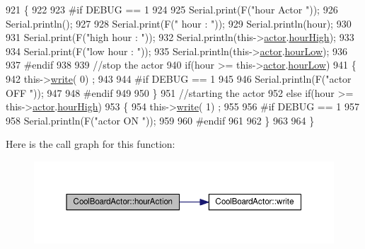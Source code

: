 \begin{DoxyCode}
921 \{
922 
923 \textcolor{preprocessor}{#if DEBUG == 1}
924     
925     Serial.print(F(\textcolor{stringliteral}{"hour Actor "}));
926     Serial.println();
927 
928     Serial.print(F(\textcolor{stringliteral}{" hour : "}));
929     Serial.println(hour);
930 
931     Serial.print(F(\textcolor{stringliteral}{"high hour : "}));
932     Serial.println(this->\hyperlink{class_cool_board_actor_a8f190db9f7a39fddbcef7f152da970e9}{actor}.\hyperlink{struct_cool_board_actor_1_1state_acd1af3ac2382258a5b05497d814adc01}{hourHigh});
933 
934     Serial.print(F(\textcolor{stringliteral}{"low hour : "}));
935     Serial.println(this->\hyperlink{class_cool_board_actor_a8f190db9f7a39fddbcef7f152da970e9}{actor}.\hyperlink{struct_cool_board_actor_1_1state_ae7034bf95b36f1392f9de076fa0c8c0f}{hourLow});
936 
937 \textcolor{preprocessor}{#endif}
938 
939     \textcolor{comment}{//stop the actor    }
940     \textcolor{keywordflow}{if}(hour >= this->\hyperlink{class_cool_board_actor_a8f190db9f7a39fddbcef7f152da970e9}{actor}.\hyperlink{struct_cool_board_actor_1_1state_ae7034bf95b36f1392f9de076fa0c8c0f}{hourLow})
941     \{
942         this->\hyperlink{class_cool_board_actor_a958786ff01ea1056ee72c72d439f86da}{write}( 0) ;
943 
944 \textcolor{preprocessor}{    #if DEBUG == 1 }
945 
946         Serial.println(F(\textcolor{stringliteral}{"actor OFF "}));
947 
948 \textcolor{preprocessor}{    #endif  }
949 
950     \}
951     \textcolor{comment}{//starting the actor}
952     \textcolor{keywordflow}{else} \textcolor{keywordflow}{if}(hour >= this->\hyperlink{class_cool_board_actor_a8f190db9f7a39fddbcef7f152da970e9}{actor}.\hyperlink{struct_cool_board_actor_1_1state_acd1af3ac2382258a5b05497d814adc01}{hourHigh})
953     \{
954         this->\hyperlink{class_cool_board_actor_a958786ff01ea1056ee72c72d439f86da}{write}( 1) ;
955 
956 \textcolor{preprocessor}{    #if DEBUG == 1 }
957 
958         Serial.println(F(\textcolor{stringliteral}{"actor ON "}));
959 
960 \textcolor{preprocessor}{    #endif  }
961     
962     \}
963 
964 \}
\end{DoxyCode}
Here is the call graph for this function\+:
\nopagebreak
\begin{figure}[H]
\begin{center}
\leavevmode
\includegraphics[width=350pt]{dc/d69/class_cool_board_actor_adf3b4e15b9d73681082112adf8ef95cb_cgraph}
\end{center}
\end{figure}
